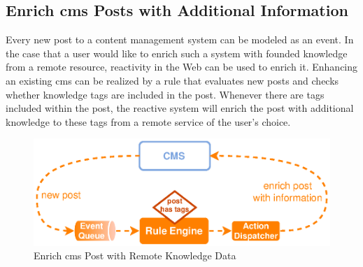 \subsection{Enrich \textrm{\acrshort{cms}} Posts with Additional Information}
Every new post to a content management system can be modeled as an event.
In the case that a user would like to enrich such a system with founded knowledge from a remote resource, reactivity in the Web can be used to enrich it.
Enhancing an existing \textrm{\acrshort{cms}} can be realized by a rule that evaluates new posts and checks whether knowledge tags are included in the post.
Whenever there are tags included within the post, the reactive system will enrich the post with additional knowledge to these tags from a remote service of the user's choice.
\begin{figure}[!ht]
  \centering
  \includegraphics{figures/ProBinderAnnotations}
  \caption{Enrich \acrshort{cms} Post with Remote Knowledge Data}
  \label{fig:ProBinderAnnotations}
\end{figure}


